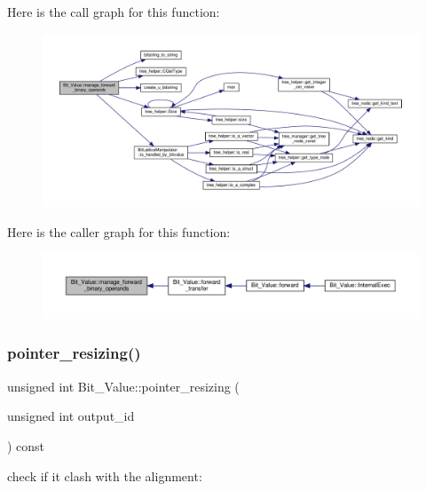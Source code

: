 Here is the call graph for this function\+:
\nopagebreak
\begin{figure}[H]
\begin{center}
\leavevmode
\includegraphics[width=350pt]{df/d4b/classBit__Value_a8d3cd62d0c1494696fa746657ad23a7e_cgraph}
\end{center}
\end{figure}
Here is the caller graph for this function\+:
\nopagebreak
\begin{figure}[H]
\begin{center}
\leavevmode
\includegraphics[width=350pt]{df/d4b/classBit__Value_a8d3cd62d0c1494696fa746657ad23a7e_icgraph}
\end{center}
\end{figure}
\mbox{\label{classBit__Value_a91a36b568a7e9ddf21b7069ee4ecc518}} 
\subsubsection{\texorpdfstring{pointer\+\_\+resizing()}{pointer\_resizing()}}
{\footnotesize\ttfamily unsigned int Bit\+\_\+\+Value\+::pointer\+\_\+resizing (\begin{DoxyParamCaption}\item[{unsigned int}]{output\+\_\+id }\end{DoxyParamCaption}) const\hspace{0.3cm}{\ttfamily [private]}}

check if it clash with the alignment\+: 

